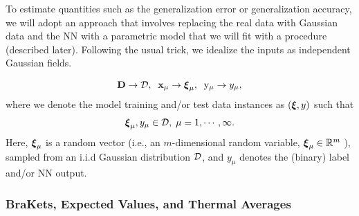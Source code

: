 To estimate quantities such as the generalization error or generalization accuracy, we will adopt an approach that involves
replacing the real data with Gaussian data and
the NN with a parametric model that we will fit with a \SemiEmpirical procedure (described later).
Following the usual \StatisticalMechanics trick, we idealize the inputs as independent Gaussian fields.

\begin{align}
\label{eqn:model_real_world_expt}
  \mathbf{D} \rightarrow \mathcal{D},\;\;{\mathbf{x}}_{\mu} \rightarrow \boldsymbol{\xi}_{\mu},\;\;  \mathrm{y}_{\mu} \rightarrow y_{\mu}  ,
\end{align}
where we denote the model training and/or test data instances as $(\boldsymbol{\xi},y)$ such that
\begin{align}
    \label{eqn:xi}
  \boldsymbol{\xi}_{\mu}, y_{\mu} \in\mathcal{D},\;\mu=1, \cdots, \infty  .
\end{align}
Here,  $\boldsymbol{\xi}_{\mu}$ is a random vector (i.e., an $m$-dimensional random variable, $\boldsymbol{\xi}_{\mu}\in\mathbb{R}^{m}$ ),
sampled from an i.i.d Gaussian distribution $\mathcal{D}$,
and $y_{\mu}$ denotes the (binary) label and/or NN output.

\subsubsection{BraKets, Expected Values, and Thermal Averages}
\label{sxn:mathP_averages}

